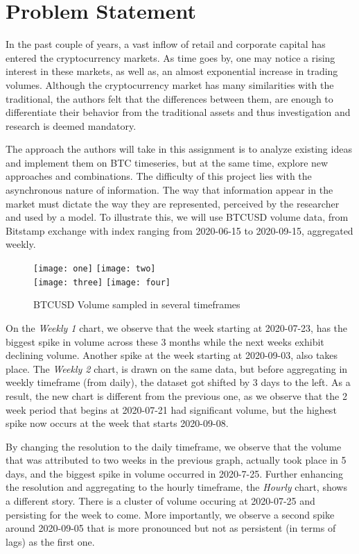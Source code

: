 \section{Problem Statement}

In the past couple of years, a vast inflow of retail and corporate capital has entered the cryptocurrency markets. As time goes by, one may notice a rising interest in these markets, as well as, an almost exponential increase in trading volumes. Although the cryptocurrency
market has many similarities with the traditional, the authors felt that the differences between them, are enough to differentiate their behavior from the traditional assets and thus investigation and research is deemed mandatory.

The approach the authors will take in this assignment is to analyze existing ideas and implement them on BTC timeseries, but at the same time, explore new approaches and combinations. The difficulty of this project lies with the asynchronous nature of information.
The way that information appear in the market must dictate the way they are represented, perceived by the researcher and used by a model. To illustrate this, we will use BTCUSD volume data, from Bitstamp exchange with index ranging from 2020-06-15 to 2020-09-15, aggregated weekly.

\begin{figure}[h]
	\centering
    \texttt{[image: one]}
    \texttt{[image: two]}
    \\[\smallskipamount]
    \texttt{[image: three]}
    \texttt{[image: four]}
    \caption{BTCUSD Volume sampled in several timeframes}\label{fig:example}
\end{figure}


On the \textit{Weekly 1} chart, we observe that the week starting at 2020-07-23, has the biggest spike in volume across these 3 months while the next weeks exhibit declining volume. Another spike at
the week starting at 2020-09-03, also takes place. The \textit{Weekly 2} chart, is drawn on the same data, but before aggregating in weekly
timeframe (from daily), the dataset got shifted by 3 days to the left. As a result, the new chart is different from the previous one, as we observe
that the 2 week period that begins at 2020-07-21 had significant volume, but the highest spike now occurs at the week that starts 2020-09-08.

By changing the resolution to the daily timeframe, we observe that the volume that was attributed to two weeks in the previous graph, actually took place in 5 days, and the biggest spike in volume occurred in 2020-7-25. Further enhancing the resolution and aggregating to the hourly timeframe, the \textit{Hourly} chart,
shows a different story. There is a cluster of volume occuring at 2020-07-25 and persisting for
the week to come. More importantly, we observe a second spike around 2020-09-05 that is more pronounced but not as persistent (in terms of lags) as the first one.

